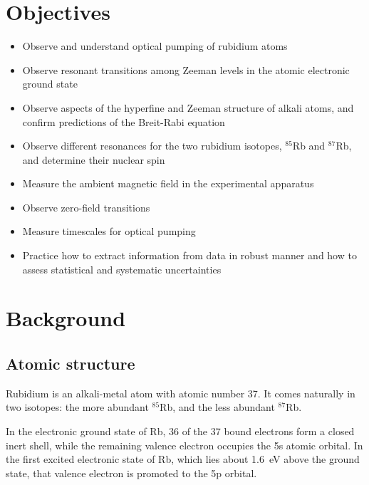 \documentclass{../lab}
\begin{document}




\noindent 
\section{Objectives}
\begin{itemize}
    \item Observe and understand optical pumping of rubidium atoms
    \item Observe resonant transitions among Zeeman levels in the atomic electronic ground state
    \item Observe aspects of the hyperfine and Zeeman structure of alkali atoms, and confirm predictions of the Breit-Rabi equation
    \item Observe different resonances for the two rubidium isotopes, $^{85}$Rb and $^{87}$Rb, and determine their nuclear spin
    \item Measure the ambient magnetic field in the experimental apparatus
    \item Observe zero-field transitions
    \item Measure timescales for optical pumping
    \item Practice how to extract information from data in robust manner and how to assess statistical and systematic uncertainties
\end{itemize}

\section{Background}

\subsection{Atomic structure}

Rubidium is an alkali-metal atom with atomic number 37.  It comes naturally in two isotopes: the more abundant $^{85}$Rb, and the less abundant $^{87}$Rb.

In the electronic ground state of Rb, 36 of the 37 bound electrons form a closed inert shell, while the remaining valence electron occupies the 5s atomic orbital.  In the first excited electronic state of Rb, which lies about 1.6~eV above the ground state, that valence electron is promoted to the 5p orbital.
\end{document}

